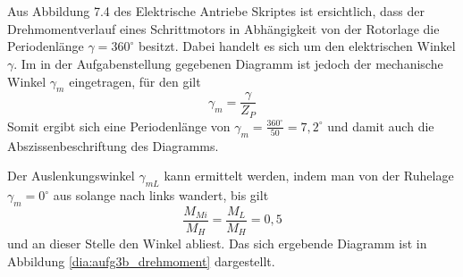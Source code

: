 \chapter{}\label{ex:aufg3}

\section{}\label{sec:aufg3a}

\section{}\label{sec:aufg3b}
Aus Abbildung 7.4 des Elektrische Antriebe Skriptes ist ersichtlich, dass der Drehmomentverlauf eines Schrittmotors in Abhängigkeit von der Rotorlage die Periodenlänge $\gamma = 360^\circ$ besitzt. Dabei handelt es sich um den elektrischen Winkel $\gamma$. Im in der Aufgabenstellung gegebenen Diagramm ist jedoch der mechanische Winkel $\gamma_m$ eingetragen, für den gilt
\begin{equation}
    \gamma_m = \frac{\gamma}{Z_P}
\end{equation}
Somit ergibt sich eine Periodenlänge von $\gamma_m = \frac{360^\circ}{50} = 7,2^\circ$ und damit auch die Abszissenbeschriftung des Diagramms.

Der Auslenkungswinkel $\gamma_{mL}$ kann ermittelt werden, indem man von der Ruhelage $\gamma_m = 0^\circ$ aus solange nach links wandert, bis gilt
\begin{equation}
    \frac{M_{Mi}}{M_H} = \frac{M_L}{M_H} = 0,5
\end{equation}
und an dieser Stelle den Winkel abliest.
Das sich ergebende Diagramm ist in Abbildung \ref{dia:aufg3b_drehmoment} dargestellt.



\clearpage